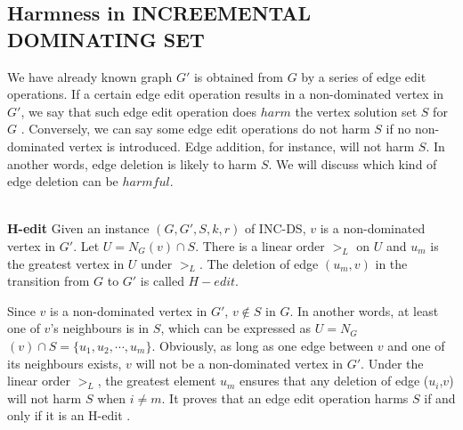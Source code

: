 \subsection{Harmness in \large{I}\normalsize{NCREEMENTAL} \large{D}\normalsize{OMINATING}  \Large{S}\normalsize{ET}} \label{subsec:harmincds}
We have already known graph $G'$ is obtained from $G$ by a series of edge edit operations. If a certain edge edit operation results in a non-dominated vertex in $G'$, we say that such edge edit operation does $harm$ the vertex solution set $S$ for $G$ \cite{downey2014}.  Conversely, we can say some edge edit operations do not harm $S$ if no non-dominated vertex is introduced. Edge addition, for instance, will not harm $S$. In another words, edge deletion is likely to harm $S$. We will discuss which kind of edge deletion can be $harmful$.
\\
\\
\begin{defn} \textbf{H-edit} \cite{downey2014} Given an instance $(G,G',S,k,r)$ of \large{I}\normalsize{NC}-\large{DS}, $v$ is a non-dominated vertex in $G'$. Let $U=N_G$$(v)\cap S$. There is a linear order $>_L$ on $U$ and $u_m$ is the greatest vertex in $U$ under $>_L$. The deletion of edge $(u_m,v)$ in the transition from $G$ to $G'$ is called $H-edit$.
\end{defn}
Since $v$ is a non-dominated vertex in $G'$, $v \notin S$ in $G$. In another words, at least one of $v$'s neighbours is in $S$, which can be expressed as $U=N_G$$(v)\cap S=\{u_1,u_2,\cdots,u_m\}$. Obviously, as long as one edge between $v$ and one of its neighbours exists, $v$ will not be a non-dominated vertex in $G'$. Under the linear order $>_L$, the greatest element $u_m$ ensures that any deletion of edge ($u_i$,$v$) will not harm $S$ when $i\neq m$. It proves that an edge edit operation harms $S$ if and only if it is an H-edit \cite{downey2014}.


